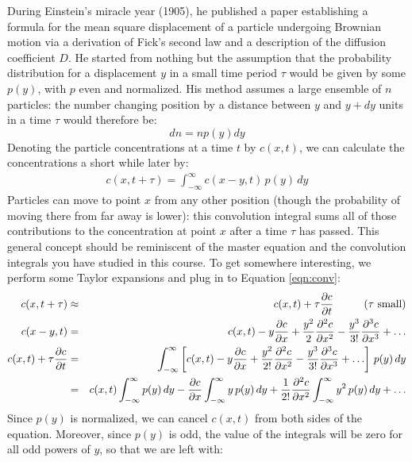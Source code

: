 \documentclass{article}
\begin{document}
During Einstein's miracle year (1905), he published a paper establishing a formula for the mean square displacement of a particle undergoing Brownian motion via a derivation of Fick's second law and a description of the diffusion coefficient $D$. He started from nothing but the assumption that the probability distribution for a displacement $y$ in a small time period $\tau$ would be given by some $p(y)$, with $p$ even and normalized. His method assumes a large ensemble of $n$ particles: the number changing position by a distance between $y$ and $y + dy$ units in a time $\tau$ would therefore be:
\[ dn = n p(y) dy \]
Denoting the particle concentrations at a time $t$ by $c(x,t)$, we can calculate the concentrations a short while later by:
\begin{eqnarray}
 c(x,t+\tau) = \int_{-\infty}^{\infty} c(x-y,t) \, p(y) \, dy \label{eqn:conv}
 \end{eqnarray}
Particles can move to point $x$ from any other position (though the probability of moving there from far away is lower): this convolution integral sums all of those contributions to the concentration at point $x$ after a time $\tau$ has passed. This general concept should be reminiscent of the master equation and the convolution integrals you have studied in this course. To get somewhere interesting, we perform some Taylor expansions and plug in to Equation \ref{eqn:conv}:
\begin{eqnarray*}
c(x,t+\tau) & \approx & c(x,t) + \tau \frac{\partial c}{\partial t} \hspace{1 cm} \textrm{($\tau$ small)}\\
c(x-y,t) & = & c(x,t) -y \frac{\partial c}{\partial x} + \frac{y^2}{2} \frac{\partial^2 c}{\partial x^2} - \frac{y^3}{3!} \frac{\partial^3 c}{\partial x^3} + \ldots\\
 c(x,t) + \tau \frac{\partial c}{\partial t} & = & \int_{-\infty}^{\infty}  \left[ c(x,t) -y \frac{\partial c}{\partial x} + \frac{y^2}{2!} \frac{\partial^2 c}{\partial x^2} - \frac{y^3}{3!} \frac{\partial^3 c}{\partial x^3} + \ldots \right] \, p(y) \, dy\\
 & = & c(x,t) \int_{-\infty}^{\infty} p(y) \, dy - \frac{\partial c}{\partial x}  \int_{-\infty}^{\infty} y \, p(y) \, dy + \frac{1}{2!} \frac{\partial^2 c}{\partial x^2} \int_{-\infty}^{\infty} y^2 \, p(y) \, dy + \ldots
\end{eqnarray*}
Since $p(y)$ is normalized, we can cancel $c(x,t)$ from both sides of the equation. Moreover, since $p(y)$ is odd, the value of the integrals will be zero for all odd powers of $y$, so that we are left with:
\end{document}
